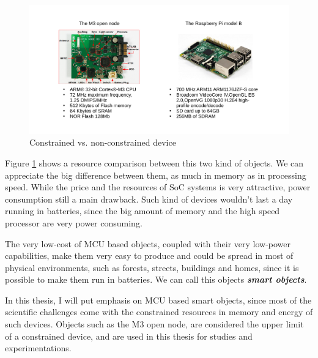 \begin{figure}[htb]
	\centering
	\includegraphics[width=1\columnwidth]{chapters/background.images/BoardsComparison.pdf}
	\caption{Constrained vs. non-constrained device}
	\label{fig:BoardsComparison}
\end{figure}

Figure \ref{fig:BoardsComparison} shows a resource comparison between this two kind of objects.
We can appreciate the big difference between them, as much in memory as in processing speed.
While the price and the resources of SoC systems is very attractive, power consumption still a main drawback.
Such kind of devices wouldn't last a day running in batteries, since the big amount of memory and the high speed processor are very power consuming.

The very low-cost of MCU based objects, coupled with their very low-power capabilities, make them very easy to produce and could be spread in most of physical environments, such as forests, streets, buildings and homes, since it is possible to make them run in batteries.
We can call this objects \textit{\textbf{smart objects}}.

In this thesis, I will put emphasis on MCU based smart objects, since most of the scientific challenges come with the constrained resources in memory and energy of such devices. 
Objects such as the M3 open node, are considered the upper limit of a constrained device, and are used in this thesis for studies and experimentations.

